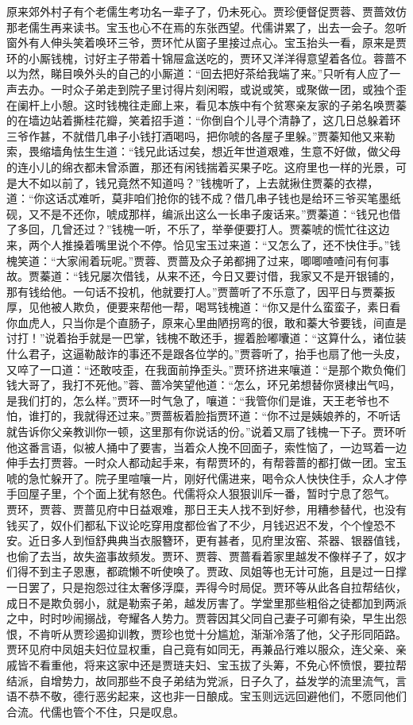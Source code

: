 \documentclass[12pt,oneside]{book}
\begin{document}
原来郊外村子有个老儒生考功名一辈子了，仍未死心。贾珍便督促贾蓉、贾蔷效仿那老儒生再来读书。宝玉也心不在焉的东张西望。代儒讲累了，出去一会子。忽听窗外有人伸头笑着唤环三爷，贾环忙从窗子里接过点心。宝玉抬头一看，原来是贾环的小厮钱槐，讨好主子带着十锦屉盒送吃的，贾环又洋洋得意望着各位。蓉蔷不以为然，睇目唤外头的自己的小厮道：“回去把好茶给我端了来。”只听有人应了一声去办。一时众子弟走到院子里讨得片刻闲暇，或说或笑，或聚做一团，或独个歪在阑杆上小憩。这时钱槐往走廊上来，看见本族中有个贫寒亲友家的子弟名唤贾蓁的在墙边站着撕桂花瓣，笑着招手道：“你倒自个儿寻个清静了，这几日总躲着环三爷作甚，不就借几串子小钱打酒喝吗，把你唬的各屋子里躲。”贾蓁知他又来勒索，畏缩墙角怯生生道：“钱兄此话过矣，想近年世道艰难，生意不好做，做父母的连小儿的绵衣都未曾添置，那还有闲钱揣着买果子吃。这府里也一样的光景，可是大不如以前了，钱兄竟然不知道吗？”钱槐听了，上去就揪住贾蓁的衣襟，道：“你这话忒难听，莫非咱们抢你的钱不成？借几串子钱也是给环三爷买笔墨纸砚，又不是不还你，唬成那样，编派出这么一长串子废话来。”贾蓁道：“钱兄也借了多回，几曾还过？”钱槐一听，不乐了，举拳便要打人。贾蓁唬的慌忙往这边来，两个人推搡着嘴里说个不停。恰见宝玉过来道：“又怎么了，还不快住手。”钱槐笑道：“大家闹着玩呢。”贾蓉、贾蔷及众子弟都拥了过来，唧唧喳喳问有何事故。贾蓁道：“钱兄屡次借钱，从来不还，今日又要讨借，我家又不是开银铺的，那有钱给他。一句话不投机，他就要打人。”贾蔷听了不乐意了，因平日与贾蓁扳厚，见他被人欺负，便要来帮他一帮，喝骂钱槐道：“你又是什么蛮蛮子，素日看你血虎人，只当你是个直肠子，原来心里曲陋拐弯的很，敢和蓁大爷要钱，间直是讨打！”说着抬手就是一巴掌，钱槐不敢还手，握着脸嘟囔道：“这算什么，诸位装什么君子，这逼勒敲诈的事还不是跟各位学的。”贾蓉听了，抬手也扇了他一头皮，又啐了一口道：“还敢吱歪，在我面前挣歪头。”贾环挤进来嚷道：“是那个欺负俺们钱大哥了，我打不死他。”蓉、蔷冷笑望他道：“怎么，环兄弟想替你贤棣出气吗，是我们打的，怎么样。”贾环一时气急了，嚷道：“我管你们是谁，天王老爷也不怕，谁打的，我就得还过来。”贾蔷板着脸指贾环道：“你不过是姨娘养的，不听话就告诉你父亲教训你一顿，这里那有你说话的份。”说着又扇了钱槐一下子。贾环听他这番言语，似被人捅中了要害，当着众人挽不回面子，索性恼了，一边骂着一边伸手去打贾蓉。一时众人都动起手来，有帮贾环的，有帮蓉蔷的都打做一团。宝玉唬的急忙躲开了。院子里喧嚷一片，刚好代儒进来，喝令众人快快住手，众人才停手回屋子里，个个面上犹有怒色。代儒将众人狠狠训斥一番，暂时宁息了怨气。
贾环，贾蓉、贾蔷见府中日益艰难，那日王夫人找不到好参，用糟参替代，也没有钱买了，奴仆们都私下议论吃穿用度都俭省了不少，月钱迟迟不发，个个惶恐不安。近日多人到恒舒典典当衣服簪环，更有甚者，见府里汝窑、茶器、银器值钱，也偷了去当，故失盗事故频发。贾环、贾蓉、贾蔷看着家里越发不像样子了，奴才们得不到主子恩惠，都疏懒不听使唤了。贾政、凤姐等也无计可施，且是过一日撑一日罢了，只是抱怨过往太奢侈浮糜，弄得今时局促。贾环等从此各自拉帮结伙，成日不是欺负弱小，就是勒索子弟，越发厉害了。学堂里那些粗俗之徒都加到两派之中，时时吵闹搦战，夸耀各人势力。贾蓉因其父同自己妻子可卿有染，早生出怨恨，不肯听从贾珍遏抑训教，贾珍也觉十分尴尬，渐渐冷落了他，父子形同陌路。贾环见府中凤姐夫妇位显权重，自己竟有如同无，再兼品行难以服众，连父亲、亲戚皆不看重他，将来这家中还是贾琏夫妇、宝玉拔了头筹，不免心怀愤恨，要拉帮结派，自增势力，故同那些不良子弟结为党派，日子久了，益发学的流里流气，言语不恭不敬，德行恶劣起来，这也非一日酿成。宝玉则远远回避他们，不愿同他们合流。代儒也管个不住，只是叹息。
\end{document}
